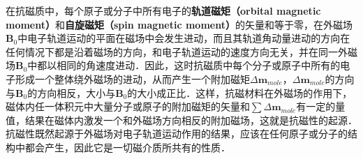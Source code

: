 
在抗磁质中，每个原子或分子中所有电子的\textbf{轨道磁矩（orbital magnetic moment）}和\textbf{自旋磁矩（spin magnetic moment）}的矢量和等于零，在外磁场$\mathbf B_0$中电子轨道运动的平面在磁场中会发生进动，而且其轨道角动量进动的方向在任何情况下都是沿着磁场的方向，和电子轨道运动的速度方向无关，并在同一外磁场$\mathbf B_0$中都以相同的角速度进动．因此，这时抗磁质中每个分子或原子中所有的电子形成一个整体绕外磁场的进动，从而产生一个附加磁矩$\Delta\mathbf{m}_{mole}$，$\Delta\mathbf{m}_{mole}$的方向与$\mathbf B_0$的方向相反，大小与$\mathbf B_0$的大小成正比．这样，抗磁材料在外磁场的作用下，磁体内任一体积元中大量分子或原子的附加磁矩的矢量和$\sum \Delta\mathbf{m}_{mole}$有一定的量值，结果在磁体内激发一个和外磁场方向相反的附加磁场，这就是抗磁性的起源．抗磁性既然起源于外磁场对电子轨道运动作用的结果，应该在任何原子或分子的结构中都会产生，因此它是一切磁介质所共有的性质．